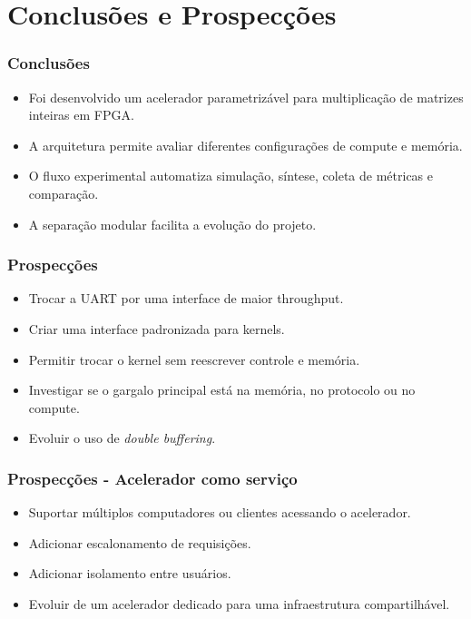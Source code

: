 \documentclass{beamer}
\begin{document}
\section{Conclusões e Prospecções}

\begin{frame}
\frametitle{Conclusões}

\begin{itemize}
    \item Foi desenvolvido um acelerador parametrizável para multiplicação de matrizes inteiras em FPGA.
    \item A arquitetura permite avaliar diferentes configurações de compute e memória.
    \item O fluxo experimental automatiza simulação, síntese, coleta de métricas e comparação.
    \item A separação modular facilita a evolução do projeto.
\end{itemize}

\end{frame}

\begin{frame}
\frametitle{Prospecções}

\begin{itemize}
    \item Trocar a UART por uma interface de maior throughput.
    \item Criar uma interface padronizada para kernels.
    \item Permitir trocar o kernel sem reescrever controle e memória.
    \item Investigar se o gargalo principal está na memória, no protocolo ou no compute.
    \item Evoluir o uso de \textit{double buffering}.
\end{itemize}

\end{frame}

\begin{frame}
\frametitle{Prospecções - Acelerador como serviço}

\begin{itemize}
    \item Suportar múltiplos computadores ou clientes acessando o acelerador.
    \item Adicionar escalonamento de requisições.
    \item Adicionar isolamento entre usuários.
    \item Evoluir de um acelerador dedicado para uma infraestrutura compartilhável.
\end{itemize}

\end{frame}
\end{document}
